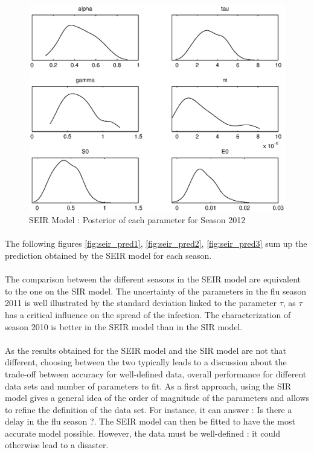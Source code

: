 \documentclass[11pt, a4paper]{article}
\begin{document}
\begin{figure}[H!]
    \includegraphics[height = 0.25\textheight]{figures/SEIR_posterior_season3.eps}
    \caption{SEIR Model : Posterior of each parameter for Season 2012}
    \label{fig:seir_post3}
\end{figure}


\paragraph{}
The following figures \ref{fig:seir_pred1}, \ref{fig:seir_pred2}, \ref{fig:seir_pred3} sum up the prediction obtained by the SEIR model for each season.

\paragraph{}
The comparison between the different seasons in the SEIR model are equivalent to the one on the SIR model. The uncertainty of the parameters in the flu season 2011 is well illustrated by the standard deviation linked to the parameter $\tau$, as $\tau$ has a critical influence on the spread of the infection. The characterization of season 2010 is better in the SEIR model than in the SIR model.

\paragraph{}
As the results obtained for the SEIR model and the SIR model are not that different, choosing between the two typically leads to a discussion about the trade-off between accuracy for well-defined data, overall performance for different data sets and number of parameters to fit. As a first approach, using the SIR model gives a general idea of the order of magnitude of the parameters and allows to refine the definition of the data set. For instance, it can answer : Is there a delay in the flu season ?. The SEIR model can then be fitted to have the most accurate model possible. However, the data must be well-defined : it could otherwise lead to a disaster.
\end{document}
